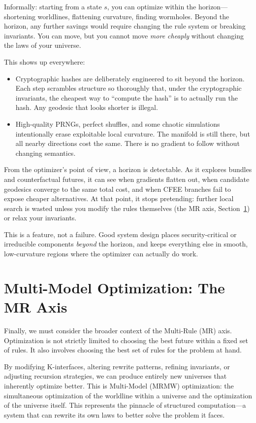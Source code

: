Informally: starting from a state $s$, you can optimize within the horizon—shortening worldlines, flattening curvature, finding wormholes. Beyond the horizon, any further savings would require changing the rule system or breaking invariants. You can move, but you cannot move \emph{more cheaply} without changing the laws of your universe.

This shows up everywhere:

\begin{itemize}
  \item Cryptographic hashes are deliberately engineered to sit beyond the horizon. Each step scrambles structure so thoroughly that, under the cryptographic invariants, the cheapest way to ``compute the hash'' is to actually run the hash. Any geodesic that looks shorter is illegal.
  \item High-quality PRNGs, perfect shuffles, and some chaotic simulations intentionally erase exploitable local curvature. The manifold is still there, but all nearby directions cost the same. There is no gradient to follow without changing semantics.
\end{itemize}

From the optimizer’s point of view, a horizon is detectable. As it explores bundles and counterfactual futures, it can see when gradients flatten out, when candidate geodesics converge to the same total cost, and when CFEE branches fail to expose cheaper alternatives. At that point, it stops pretending: further local search is wasted unless you modify the rules themselves (the MR axis, Section~\ref{multi-model-optimization-mr-axis}) or relax your invariants.

This is a feature, not a failure. Good system design places security-critical or irreducible components \emph{beyond} the horizon, and keeps everything else in smooth, low-curvature regions where the optimizer can actually do work.

\section{Multi-Model Optimization: The MR Axis}
\label{multi-model-optimization-mr-axis}

Finally, we must consider the broader context of the Multi-Rule (MR) axis. Optimization is not strictly limited to choosing the best future within a fixed set of rules. It also involves choosing the best set of rules for the problem at hand.

By modifying K-interfaces, altering rewrite patterns, refining invariants, or adjusting recursion strategies, we can produce entirely new universes that inherently optimize better. This is Multi-Model (MRMW) optimization: the simultaneous optimization of the worldline within a universe and the optimization of the universe itself. This represents the pinnacle of structured computation—a system that can rewrite its own laws to better solve the problem it faces.

